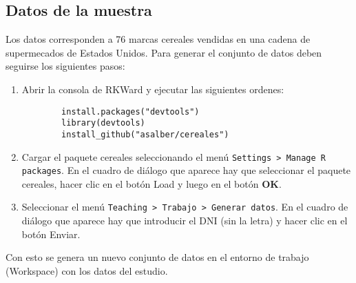 \documentclass[a4paper,titlepage]{article}
\begin{document}
\subsection*{\color{blueceu}Datos de la muestra}
Los datos corresponden a 76 marcas cereales vendidas en una cadena de supermecados de Estados Unidos.
Para generar el conjunto de datos deben seguirse los siguientes pasos:
\begin{enumerate}
	\item Abrir la consola de RKWard y ejecutar las siguientes ordenes:
	\begin{verbatim}
		install.packages("devtools")
		library(devtools)
		install_github("asalber/cereales")
	\end{verbatim}
	\item Cargar el paquete \textsf{cereales} seleccionando el menú \texttt{Settings > Manage R packages}. En el cuadro de diálogo que aparece hay que seleccionar el paquete \textsf{cereales}, hacer clic en el botón \textsf{Load} y luego en el botón \textbf{OK}.
	\item Seleccionar el menú \texttt{Teaching > Trabajo > Generar datos}. En el cuadro de diálogo que aparece hay que introducir el DNI (sin la letra) y hacer clic en el botón \textsf{Enviar}.
\end{enumerate}
Con esto se genera un nuevo conjunto de datos en el entorno de trabajo (Workspace) con los datos del estudio.
\end{document}
